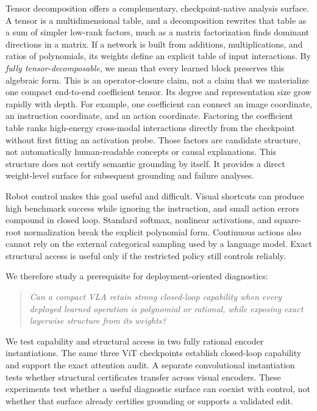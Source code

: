 \documentclass{article}
\begin{document}
Tensor decomposition offers a complementary, checkpoint-native analysis surface. A tensor is a
multidimensional table, and a decomposition rewrites that table as a sum of simpler low-rank
factors, much as a matrix factorization finds dominant directions in a matrix. If a network is
built from additions, multiplications, and ratios of polynomials, its weights define an explicit
table of input interactions. By \emph{fully tensor-decomposable}, we mean that every learned block
preserves this algebraic form. This is an operator-closure claim, not a claim that we materialize
one compact end-to-end coefficient tensor. Its degree and representation size grow rapidly with
depth. For example, one coefficient can connect an image coordinate, an instruction coordinate,
and an action coordinate. Factoring the coefficient table ranks high-energy cross-modal
interactions directly from the checkpoint without first fitting an activation probe. Those
factors are candidate structure, not automatically human-readable concepts or causal
explanations. This structure does not certify semantic grounding by itself. It provides a direct
weight-level surface for subsequent grounding and failure analyses.

Robot control makes this goal useful and difficult. Visual shortcuts can produce high benchmark
success while ignoring the instruction, and small action errors compound in closed loop. Standard
softmax, nonlinear activations, and square-root normalization break the explicit polynomial form.
Continuous actions also cannot rely on the external categorical sampling used by a language
model. Exact structural access is useful only if the restricted policy still controls reliably.

We therefore study a prerequisite for deployment-oriented diagnostics:

\begin{quote}
\emph{Can a compact VLA retain strong closed-loop capability when every deployed learned
operation is polynomial or rational, while exposing exact layerwise structure from its weights?}
\end{quote}

We test capability and structural access in two fully rational encoder instantiations. The same
three ViT checkpoints establish closed-loop capability and support the exact attention audit. A
separate convolutional instantiation tests whether structural certificates transfer across visual
encoders. These experiments test whether a useful diagnostic surface can coexist
with control, not whether that surface already certifies grounding or supports a validated edit.
\end{document}
